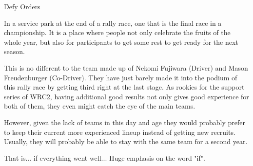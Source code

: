 \h{Defy Orders}

In a service park at the end of a rally race, one that is the final race in a championship. It is a place where people not only celebrate the fruits of the whole year, but also for participants to get some rest to get ready for the next season.

This is no different to the team made up of Nekomi Fujiwara (Driver) and Mason Freudenburger (Co-Driver). They have just barely made it into the podium of this rally race by getting third right at the last stage. As rookies for the support series of WRC2, having additional good results not only gives good experience for both of them, they even might catch the eye of the main teams.

However, given the lack of teams in this day and age they would probably prefer to keep their current more experienced lineup instead of getting new recruits. Usually, they will probably be able to stay with the same team for a second year. 

That is... if everything went well... Huge emphasis on the word "if". 


